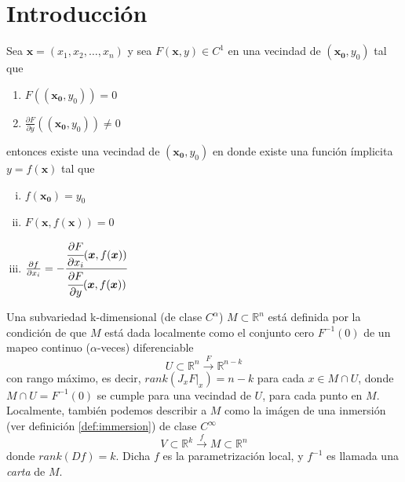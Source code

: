 \documentclass{beamer}
\def\realR{\mathbb{R}} %
\begin{document}
\section{Introducción}

\begin{frame}
    \begin{theorem}
        Sea $\bm{x} = (x_{1},x_{2},\ldots,x_{n})$ y sea $F(\bm{x},y) \in C^{1}$ 
        en una vecindad de $(\bm{x_{0}},y_{0})$ tal que
        \begin{enumerate}
            \item $F((\bm{x_{0}},y_{0})) = 0$
            \item $\frac{\partial F}{\partial y}((\bm{x_{0}},y_{0})) \ne 0$
        \end{enumerate}
        entonces existe una vecindad de $(\bm{x_{0}},y_{0})$ en donde existe una
        funci\'on \'implicita $y=f(\bm{x})$ tal que
        \begin{enumerate}[i.]
            \item $f(\bm{x_{0}}) = y_{0}$
            \item $F(\bm{x}, f(\bm{x})) = 0$
            \item $\frac{\partial f}{\partial x_{i}} = -\cfrac{\cfrac{\partial F}{\partial x_{i}}(\bm{x},f(\bm{x}))}{\cfrac{\partial F}{\partial y}(\bm{x},f(\bm{x}))}$
        \end{enumerate}
    \end{theorem}
\end{frame}

\begin{frame}
    \begin{definition}[Subvariedad]
        Una subvariedad k-dimensional (de clase $C^{\alpha}$) $M \subset \realR^{n}$ está definida por
        la condici\'on  de que $M$ est\'a dada localmente como el conjunto cero $F^{-1}(0)$ de un
        mapeo continuo ($\alpha$-veces) diferenciable
        $$ U \subset \realR^{n}  \xrightarrow{F} \realR^{n-k}$$
        con rango m\'aximo, es decir, $rank(J_{x}F|_{x})= n - k$ para cada $x \in M \cap U$, donde
        $M \cap U = F^{-1}(0)$ se cumple para una vecindad de $U$, para cada punto en $M$. \\
        Localmente, tambi\'en podemos describir a $M$ como la im\'agen de una inmersi\'on (ver
        definici\'on \ref{def:immersion}) de clase $C^{\infty}$
        $$ V \subset \realR^{k} \xrightarrow{f} M \subset \realR^{n} $$
        donde $rank(Df)=k$. Dicha $f$ es la parametrizaci\'on local, y $f^{-1}$ es llamada una \emph{carta}
        de $M$.
    \end{definition}
\end{frame}
\end{document}
